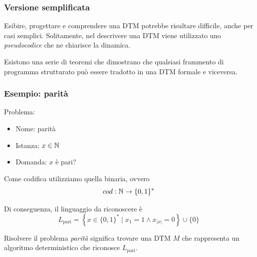 \subsubsection{Versione semplificata}

Esibire, progettare e comprendere una DTM potrebbe risultare difficile, anche per casi semplici. Solitamente, nel descrivere una DTM viene utilizzato uno \textit{pseudocodice} che ne chiarisce la dinamica.

Esistono una serie di teoremi che dimostrano che qualsiasi frammento di programma strutturato può essere tradotto in una DTM formale e viceversa.

\subsubsection{Esempio: parità}

Problema: 
\begin{itemize}
	\item Nome: parità
    
	\item Istanza: $x \in \mathbb{N}$
	
    \item Domanda: $x$ è pari?
\end{itemize}

Come codifica utilizziamo quella binaria, ovvero
$$ cod: \mathbb{N} \rightarrow \{0,1\}^\ast $$

Di conseguenza, il linguaggio da riconoscere è 
$$ L_{\text{pari}} = \left\{x \in \{0,1\}^\ast \mid x_1 = 1 \wedge x_{|x|} = 0 \right\} \cup \{0\} $$

Risolvere il problema \textit{parità} significa trovare una DTM $M$ che rappresenta un algoritmo deterministico che riconosce $L_{\text{pari}}$.

